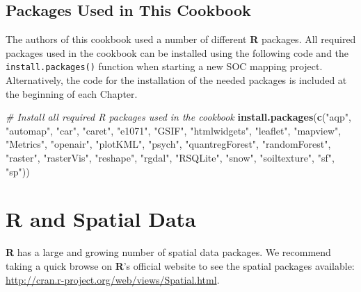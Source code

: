 \documentclass[10pt,b5paper,]{book}
\newenvironment{Shaded}{\begin{snugshade}}{\end{snugshade}}
\newcommand{\CommentTok}[1]{\textcolor[rgb]{0.56,0.35,0.01}{\textit{#1}}}
\newcommand{\KeywordTok}[1]{\textcolor[rgb]{0.13,0.29,0.53}{\textbf{#1}}}
\newcommand{\NormalTok}[1]{#1}
\newcommand{\StringTok}[1]{\textcolor[rgb]{0.31,0.60,0.02}{#1}}
\theoremstyle{definition}
\theoremstyle{definition}
\theoremstyle{definition}
\theoremstyle{remark}
\begin{document}
\hypertarget{packages-used-in-this-cookbook}{%
\subsection{Packages Used in This
Cookbook}\label{packages-used-in-this-cookbook}}

The authors of this cookbook used a number of different \textbf{R}
packages. All required packages used in the cookbook can be installed
using the following code and the \texttt{install.packages()} function
when starting a new SOC mapping project. Alternatively, the code for the
installation of the needed packages is included at the beginning of each
Chapter.

\begin{Shaded}
\begin{Highlighting}[]
\CommentTok{# Install all required R packages used in the cookbook}
\KeywordTok{install.packages}\NormalTok{(}\KeywordTok{c}\NormalTok{(}\StringTok{"aqp"}\NormalTok{, }\StringTok{"automap"}\NormalTok{, }\StringTok{"car"}\NormalTok{, }\StringTok{"caret"}\NormalTok{, }\StringTok{"e1071"}\NormalTok{,}
                   \StringTok{"GSIF"}\NormalTok{, }\StringTok{"htmlwidgets"}\NormalTok{, }\StringTok{"leaflet"}\NormalTok{, }\StringTok{"mapview"}\NormalTok{,}
                   \StringTok{"Metrics"}\NormalTok{, }\StringTok{"openair"}\NormalTok{, }\StringTok{"plotKML"}\NormalTok{, }\StringTok{"psych"}\NormalTok{, }
                   \StringTok{"quantregForest"}\NormalTok{, }\StringTok{"randomForest"}\NormalTok{, }\StringTok{"raster"}\NormalTok{,}
                   \StringTok{"rasterVis"}\NormalTok{, }\StringTok{"reshape"}\NormalTok{, }\StringTok{"rgdal"}\NormalTok{, }\StringTok{"RSQLite"}\NormalTok{,}
                   \StringTok{"snow"}\NormalTok{, }\StringTok{"soiltexture"}\NormalTok{, }\StringTok{"sf"}\NormalTok{, }\StringTok{"sp"}\NormalTok{))}
\end{Highlighting}
\end{Shaded}

\hypertarget{r-and-spatial-data}{%
\section{R and Spatial Data}\label{r-and-spatial-data}}

\textbf{R} has a large and growing number of spatial data packages. We
recommend taking a quick browse on \textbf{R}'s official website to see
the spatial packages available:
\url{http://cran.r-project.org/web/views/Spatial.html}.
\end{document}
